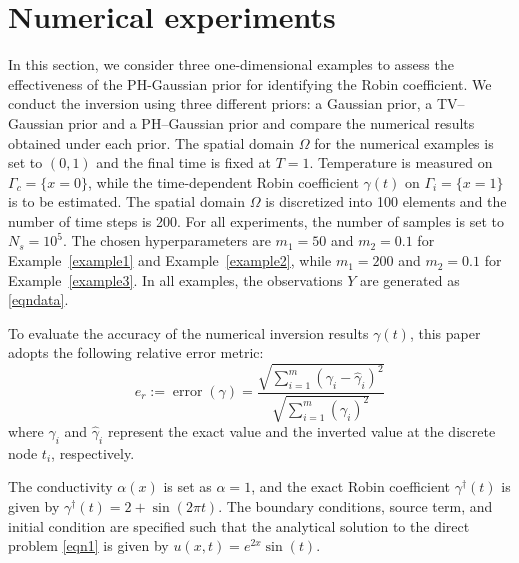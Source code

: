 \documentclass{ws-mplb}
\begin{document}
\section{Numerical experiments}\label{stest}

In this section, we consider three one-dimensional examples to assess the effectiveness of the PH-Gaussian prior for identifying the Robin coefficient. We conduct the inversion using three different priors: a Gaussian prior, a TV–Gaussian prior and a PH–Gaussian prior and compare the numerical results obtained under each prior. The spatial domain  $\Omega$ for the numerical examples is set to $(0,1)$ and the final time is fixed at $T = 1$. Temperature is measured on $\Gamma_c = \{x = 0\}$, while the time-dependent Robin coefficient $\gamma(t)$ on $\Gamma_i = \{x = 1\}$ is to be estimated. The spatial domain $\Omega$ is discretized into 100 elements and the number of time steps is 200. For all experiments, the number of samples is set to $N_s = 10^5$. The chosen hyperparameters are \( m_1 = 50 \) and \( m_2 = 0.1 \) for  Example~\ref{example1} and Example~\ref{example2}, while \( m_1 = 200 \) and \( m_2 = 0.1 \) for Example~\ref{example3}. In all examples, the observations $Y$ are generated as \eqref{eqndata}.


To evaluate the accuracy of the numerical inversion results $\gamma(t)$, this paper adopts the following relative error metric:
\[
e_r:=\operatorname{error}(\gamma) = \frac{\sqrt{\sum_{i=1}^{m} (\gamma_i - \hat{\gamma}_i)^2}}{\sqrt{\sum_{i=1}^{m} (\gamma_i)^2}}
\]
where $\gamma_i$ and $\hat{\gamma}_i$ represent the exact value and the inverted value at the discrete node $t_i$, respectively.


\begin{example}
\label{example1}
The conductivity $\alpha(x)$ is set as $\alpha = 1$, and the exact Robin coefficient $\gamma^{\dagger}(t)$ is given by $\gamma^{\dagger}(t) = 2 + \sin(2\pi t)$. The boundary conditions, source term, and initial condition are specified such that the analytical solution to the direct
problem \eqref{eqn1} is given by $u(x,t) = e^{2x} \sin(t)$.
\end{example}
\end{document}
